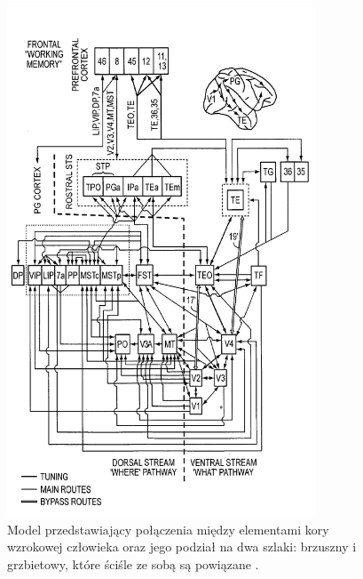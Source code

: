 \begin{figure}[ht]
	\centering
	\includegraphics[width=0.82\textwidth]{images/patent_model.png}
	\caption{Model przedstawiający połączenia między elementami kory wzrokowej człowieka oraz jego podział na dwa szlaki: brzuszny i grzbietowy, które ściśle ze sobą są powiązane \cite{USPatent}.}
	\label{fig:USPatent_model}
\end{figure}

